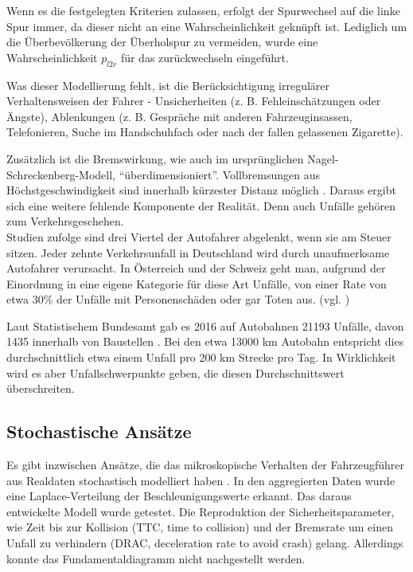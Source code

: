 Wenn es die festgelegten Kriterien zulassen, erfolgt der Spurwechsel auf die linke Spur immer, da dieser nicht an eine Wahrscheinlichkeit geknüpft ist.
Lediglich um die Überbevölkerung der Überholspur zu vermeiden, wurde eine Wahrscheinlichkeit $p_{l2r}$ für das zurückwechseln eingeführt.

Was dieser Modellierung fehlt, ist die Berücksichtigung irregulärer Verhaltensweisen der Fahrer - Unsicherheiten (z. B. Fehleinschätzungen oder Ängste), Ablenkungen (z. B. Gespräche mit anderen Fahrzeuginsassen, Telefonieren, Suche im Handschuhfach oder nach der fallen gelassenen Zigarette). 

Zusätzlich ist die Bremswirkung, wie auch im ursprünglichen Nagel-Schreckenberg-Modell, \enquote{über\-di\-men\-sio\-niert}. 
Vollbremsungen aus Höchstgeschwindigkeit sind innerhalb kürzester Distanz möglich \cite{acc-free}.
Daraus ergibt sich eine weitere fehlende Komponente der Realität.
Denn auch Unfälle gehören zum Verkehrsgeschehen. \\
Studien zufolge sind drei Viertel der Autofahrer abgelenkt, wenn sie am Steuer sitzen. 
Jeder zehnte Verkehrsunfall in Deutschland wird durch unaufmerksame Autofahrer verursacht. 
In Österreich und der Schweiz geht man, aufgrund der Einordnung in eine eigene Kategorie für diese Art Unfälle, von einer Rate von etwa 30\% der Unfälle mit Personenschäden oder gar Toten aus. (vgl. \cite{dvr-studie})

Laut Statistischem Bundesamt gab es 2016 auf Autobahnen 21193 Unfälle, davon 1435 innerhalb von Baustellen \cite{unf2016}. 
Bei den etwa 13000 km Autobahn \cite{autob2016} entspricht dies durchschnittlich etwa einem Unfall pro 200 km Strecke pro Tag. 
In Wirklichkeit wird es aber Unfallschwerpunkte geben, die diesen Durchschnittswert überschreiten.



\subsection{Stochastische Ansätze}
\label{sec:stochastic-approaches}

Es gibt inzwischen Ansätze, die das mikroskopische Verhalten der Fahrzeugführer aus Realdaten  stochastisch modelliert haben \cite{stoch-carfollow}. 
In den aggregierten Daten wurde eine Laplace-Verteilung der Beschleunigungswerte erkannt. 
Das daraus entwickelte Modell wurde getestet. 
Die Reproduktion der Sicherheitsparameter, wie Zeit bis zur Kollision (TTC, time to collision) und der Bremsrate um einen Unfall zu verhindern (DRAC, deceleration rate to avoid crash) gelang. 
Allerdings konnte das Fundamentaldiagramm nicht nachgestellt werden.

